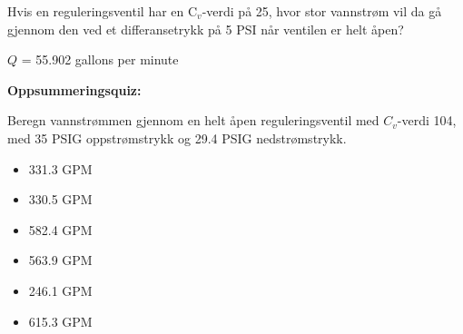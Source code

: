 

Hvis en reguleringsventil har en C$_{v}$-verdi på 25, hvor stor vannstrøm vil da gå gjennom den ved et differansetrykk på 5 PSI når ventilen er helt åpen?







$Q$ = 55.902 gallons per minute







\vfil \eject

\noindent
{\bf Oppsummeringsquiz:}

Beregn vannstrømmen gjennom en helt åpen reguleringsventil med $C_v$-verdi 104, med 35 PSIG oppstrømstrykk og 29.4 PSIG nedstrømstrykk.

\begin{itemize}
\item{} 331.3 GPM
\vskip 5pt
\item{} 330.5 GPM
\vskip 5pt
\item{} 582.4 GPM
\vskip 5pt
\item{} 563.9 GPM
\vskip 5pt
\item{} 246.1 GPM
\vskip 5pt
\item{} 615.3 GPM
\end{itemize}




